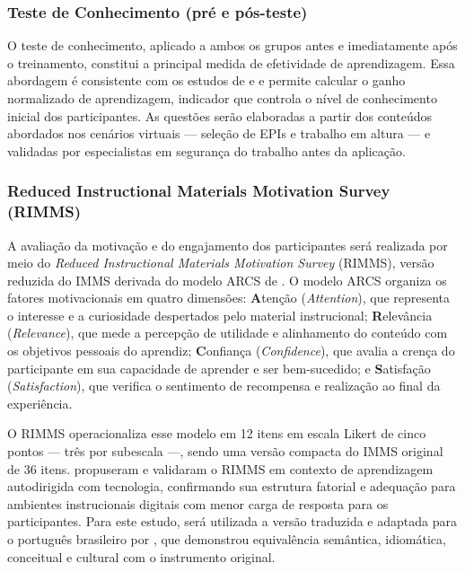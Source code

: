 \subsubsection{Teste de Conhecimento (pré e pós-teste)}

O teste de conhecimento, aplicado a ambos os grupos antes e imediatamente após o treinamento, constitui a principal medida de efetividade de aprendizagem. Essa abordagem é consistente com os estudos de  e  e permite calcular o ganho normalizado de aprendizagem, indicador que controla o nível de conhecimento inicial dos participantes. As questões serão elaboradas a partir dos conteúdos abordados nos cenários virtuais — seleção de \glspl{EPI} e trabalho em altura — e validadas por especialistas em segurança do trabalho antes da aplicação.

\subsubsection{Reduced Instructional Materials Motivation Survey (RIMMS)}

A avaliação da motivação e do engajamento dos participantes será realizada por meio do \textit{Reduced Instructional Materials Motivation Survey} (RIMMS), versão reduzida do IMMS derivada do modelo ARCS de . O modelo ARCS organiza os fatores motivacionais em quatro dimensões: \textbf{A}tenção (\textit{Attention}), que representa o interesse e a curiosidade despertados pelo material instrucional; \textbf{R}elevância (\textit{Relevance}), que mede a percepção de utilidade e alinhamento do conteúdo com os objetivos pessoais do aprendiz; \textbf{C}onfiança (\textit{Confidence}), que avalia a crença do participante em sua capacidade de aprender e ser bem-sucedido; e \textbf{S}atisfação (\textit{Satisfaction}), que verifica o sentimento de recompensa e realização ao final da experiência.

O RIMMS operacionaliza esse modelo em 12 itens em escala Likert de cinco pontos — três por subescala —, sendo uma versão compacta do IMMS original de 36 itens.  propuseram e validaram o RIMMS em contexto de aprendizagem autodirigida com tecnologia, confirmando sua estrutura fatorial e adequação para ambientes instrucionais digitais com menor carga de resposta para os participantes. Para este estudo, será utilizada a versão traduzida e adaptada para o português brasileiro por , que demonstrou equivalência semântica, idiomática, conceitual e cultural com o instrumento original.

